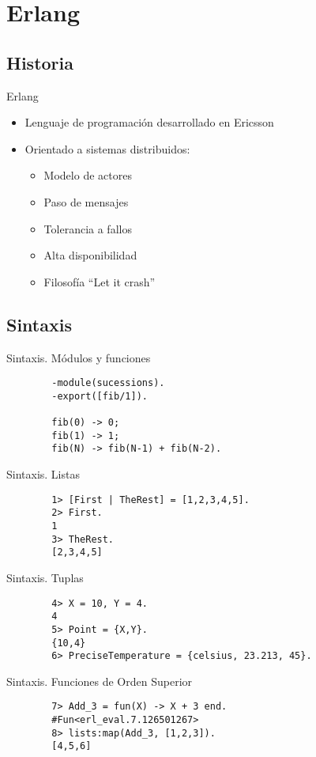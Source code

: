 \documentclass{beamer}
\begin{document}
  \section{Erlang}
    \subsection{Historia}
    \begin{frame}{Erlang}
      \begin{itemize}
        \item Lenguaje de programación desarrollado en Ericsson
        \item Orientado a sistemas distribuidos:
        \begin{itemize}
          \item Modelo de actores
          \item Paso de mensajes
          \item Tolerancia a fallos
          \item Alta disponibilidad
          \item Filosofía ``Let it crash''
        \end{itemize}
      \end{itemize}
    \end{frame}
    \subsection{Sintaxis}
    \begin{frame}[fragile]{Sintaxis. Módulos y funciones}
      \begin{verbatim}
        -module(sucessions).
        -export([fib/1]).

        fib(0) -> 0;
        fib(1) -> 1;
        fib(N) -> fib(N-1) + fib(N-2).
      \end{verbatim}
    \end{frame}

    \begin{frame}[fragile]{Sintaxis. Listas}
      \begin{verbatim}
        1> [First | TheRest] = [1,2,3,4,5].
        2> First.
        1
        3> TheRest.
        [2,3,4,5]
      \end{verbatim}
    \end{frame}
    \begin{frame}[fragile]{Sintaxis. Tuplas}
      \begin{verbatim}
        4> X = 10, Y = 4.
        4
        5> Point = {X,Y}.
        {10,4}
        6> PreciseTemperature = {celsius, 23.213, 45}.
      \end{verbatim}
    \end{frame}
    \begin{frame}[fragile]{Sintaxis. Funciones de Orden Superior}
      \begin{verbatim}
        7> Add_3 = fun(X) -> X + 3 end.
        #Fun<erl_eval.7.126501267>
        8> lists:map(Add_3, [1,2,3]).
        [4,5,6]
      \end{verbatim}
    \end{frame}
\end{document}
